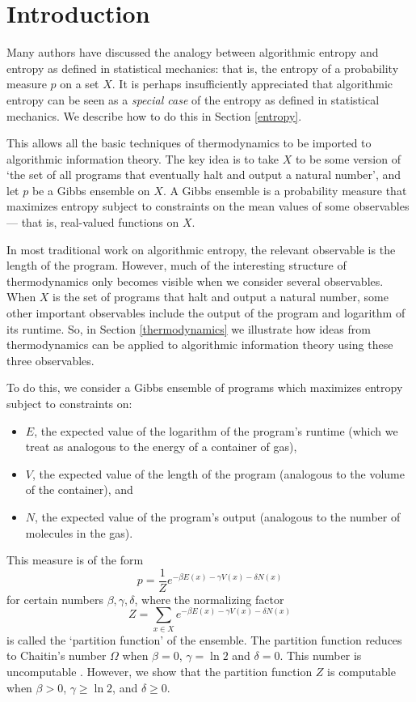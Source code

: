 \documentclass{article}
\begin{document}
\section{Introduction}\label{intro}

Many authors \cite{BGLVZ, Chaitin1975, FT1982, Kolmogorov1965, 
LevinZvonkin, Solomonoff1964, Szilard1929, Tadaki2008} have discussed 
the analogy between algorithmic entropy and entropy as defined in 
statistical mechanics: that is, the entropy of a probability measure 
$p$ on a set $X$.  It is perhaps insufficiently appreciated that 
algorithmic entropy can be seen as a \textit{special case} of the 
entropy as defined in statistical mechanics.  We describe how to do 
this in Section \ref{entropy}.

This allows all the basic techniques of thermodynamics to be imported
to algorithmic information theory.  The key idea is to take $X$ to be
some version of `the set of all programs that eventually halt and
output a natural number', and let $p$ be a Gibbs ensemble on $X$.  A
Gibbs ensemble is a probability measure that maximizes entropy subject
to constraints on the mean values of some observables --- that is,
real-valued functions on $X$.

In most traditional work on algorithmic entropy, the relevant
observable is the length of the program.  However, much of the
interesting structure of thermodynamics only becomes visible when we
consider several observables.  When $X$ is the set of programs that
halt and output a natural number, some other important observables
include the output of the program and logarithm of its runtime.  So,
in Section \ref{thermodynamics} we illustrate how ideas from
thermodynamics can be applied to algorithmic information theory using
these three observables.  

To do this, we consider a Gibbs ensemble of programs which maximizes
entropy subject to constraints on:
\begin{itemize}
\item
$E$, the expected value of the logarithm of the program's
runtime (which we treat as analogous to the energy
of a container of gas),
\item 
$V$, the expected value of the length of the program
(analogous to the volume of the container),
and 
\item
$N$, the expected value of the program's output
(analogous to the number of molecules in the gas).
\end{itemize}
This measure is of the form
\[       p = \frac{1}{Z} e^{-\beta E(x) -\gamma V(x) - \delta N(x)} \]
for certain numbers $\beta, \gamma, \delta$, where the normalizing factor
\[     Z = \sum_{x \in X} e^{-\beta E(x) -\gamma V(x) - \delta N(x)} \]
is called the `partition function' of the ensemble.  The partition
function reduces to Chaitin's number $\Omega$ when $\beta = 0$,
$\gamma = \ln 2$ and $\delta = 0$.  This number is uncomputable
\cite{Chaitin1975}.  However, we show that the partition function $Z$
is computable when $\beta > 0$, $\gamma \ge \ln 2$, and $\delta \ge 0$.
\end{document}

